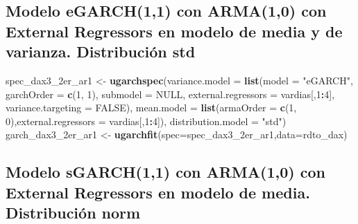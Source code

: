\documentclass[
  11pt,
]{article}
\newenvironment{Shaded}{\begin{snugshade}}{\end{snugshade}}
\newcommand{\DataTypeTok}[1]{\textcolor[rgb]{0.13,0.29,0.53}{#1}}
\newcommand{\DecValTok}[1]{\textcolor[rgb]{0.00,0.00,0.81}{#1}}
\newcommand{\KeywordTok}[1]{\textcolor[rgb]{0.13,0.29,0.53}{\textbf{#1}}}
\newcommand{\NormalTok}[1]{#1}
\newcommand{\OperatorTok}[1]{\textcolor[rgb]{0.81,0.36,0.00}{\textbf{#1}}}
\newcommand{\OtherTok}[1]{\textcolor[rgb]{0.56,0.35,0.01}{#1}}
\newcommand{\StringTok}[1]{\textcolor[rgb]{0.31,0.60,0.02}{#1}}
\begin{document}
\hypertarget{modelo-egarch11-con-arma10-con-external-regressors-en-modelo-de-media-y-de-varianza.-distribuciuxf3n-std}{%
\subsection{Modelo eGARCH(1,1) con ARMA(1,0) con External Regressors en
modelo de media y de varianza. Distribución
std}\label{modelo-egarch11-con-arma10-con-external-regressors-en-modelo-de-media-y-de-varianza.-distribuciuxf3n-std}}

\begin{Shaded}
\begin{Highlighting}[]
\NormalTok{spec_dax3_2er_ar1 <-}\StringTok{ }\KeywordTok{ugarchspec}\NormalTok{(}\DataTypeTok{variance.model =} \KeywordTok{list}\NormalTok{(}\DataTypeTok{model =} \StringTok{"eGARCH"}\NormalTok{, }\DataTypeTok{garchOrder =} \KeywordTok{c}\NormalTok{(}\DecValTok{1}\NormalTok{, }\DecValTok{1}\NormalTok{), }
                    \DataTypeTok{submodel =} \OtherTok{NULL}\NormalTok{, }\DataTypeTok{external.regressors =}\NormalTok{ vardias[,}\DecValTok{1}\OperatorTok{:}\DecValTok{4}\NormalTok{], }\DataTypeTok{variance.targeting =} \OtherTok{FALSE}\NormalTok{), }
                    \DataTypeTok{mean.model =} \KeywordTok{list}\NormalTok{(}\DataTypeTok{armaOrder =} \KeywordTok{c}\NormalTok{(}\DecValTok{1}\NormalTok{, }\DecValTok{0}\NormalTok{),}\DataTypeTok{external.regressors =}\NormalTok{ vardias[,}\DecValTok{1}\OperatorTok{:}\DecValTok{4}\NormalTok{]),}
               \DataTypeTok{distribution.model =} \StringTok{"std"}\NormalTok{)}
\NormalTok{garch_dax3_2er_ar1 <-}\StringTok{ }\KeywordTok{ugarchfit}\NormalTok{(}\DataTypeTok{spec=}\NormalTok{spec_dax3_2er_ar1,}\DataTypeTok{data=}\NormalTok{rdto_dax)}
\end{Highlighting}
\end{Shaded}

\hypertarget{modelo-sgarch11-con-arma10-con-external-regressors-en-modelo-de-media.-distribuciuxf3n-norm}{%
\subsection{Modelo sGARCH(1,1) con ARMA(1,0) con External Regressors en
modelo de media. Distribución
norm}\label{modelo-sgarch11-con-arma10-con-external-regressors-en-modelo-de-media.-distribuciuxf3n-norm}}
\end{document}
